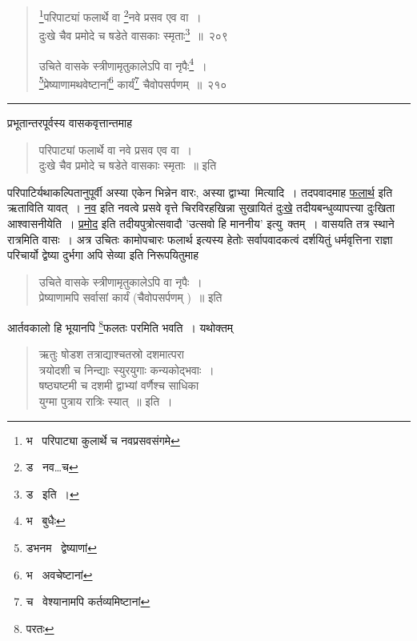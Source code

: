 \documentclass[11pt, openany]{book}
\begin{document}
\newpage

\begin{quote}
{\na \renewcommand{\thefootnote}{1}\footnote{भ \textendash\  परिपाट्या कुलार्थे च नवप्रसवसंगमे}परिपाट्यां फलार्थे वा \renewcommand{\thefootnote}{2}\footnote{ड \textendash\  नव\ldots च}नवे प्रसव एव वा~।\\
दुःखे चैव प्रमोदे च षडेते वासकाः स्मृताः\renewcommand{\thefootnote}{3}\footnote{ड \textendash\  इति~।}~॥~२०९

उचिते वासके स्त्रीणामृतुकालेऽपि वा नृपैः\renewcommand{\thefootnote}{4}\footnote{भ \textendash\  बुधैः}~।\\
\renewcommand{\thefootnote}{5}\footnote{डभनम \textendash\  द्वेष्याणां}प्रेष्याणामथवेष्टानां\renewcommand{\thefootnote}{6}\footnote{भ \textendash\  अवचेष्टानां} कार्यं\renewcommand{\thefootnote}{7}\footnote{च \textendash\  वेश्यानामपि कर्तव्यमिष्टानां} चैवोपसर्पणम्~॥~२१०}
\end{quote}

\hrule

\vspace{2mm}
प्रभूतान्तरपूर्वस्य वासकवृत्तान्तमाह\textendash

\begin{quote}
{\qt परिपाट्यां फलार्थे वा नवे प्रसव एव वा~।\\
दुःखे चैव प्रमोदे च षडेते वासकाः स्मृताः~॥} इति
\end{quote}

\noindent
परिपाटिर्यथाकल्पितानुपूर्वी अस्या एकेन भिन्नेन वारः, अस्या द्वाभ्या\textendash\ मित्यादि~। तदपवादमाह \underline{फलार्थ} इति ऋताविति यावत्~। \underline{नव} इति नवत्वे प्रसवे वृत्ते चिरविरहखिन्ना सुखायितं \underline{दुःखे} तदीयबन्धुव्यापत्त्या दुःखिता आश्वासनीयेति~। \underline{प्रमोद} इति तदीयपुत्रोत्सवादौ 'उत्सवो हि माननीय' इत्यु\textendash\ क्तम्~। वासयति तत्र स्थाने रात्रमिति वासः~। अत्र उचितः कामोपचारः फलार्थ इत्यस्य हेतोः सर्वापवादकत्वं दर्शयितुं धर्मवृत्तिना राज्ञा परिचार्यो द्वेष्या दुर्भगा अपि सेव्या इति निरूपयितुमाह\textendash

\begin{quote}
{\qt उचिते वासके स्त्रीणामृतुकालेऽपि वा नृपैः~।\\
प्रेष्याणामपि सर्वासां कार्यं (चैवोपसर्पणम् )~॥} इति
\end{quote}

\noindent
आर्तवकालो हि भूयानपि \renewcommand{\thefootnote}{*}\footnote{परतः}फलतः परमिति भवति~। यथोक्तम्\textendash

\begin{quote}
{\qt ऋतुः षोडश तत्राद्याश्चतस्रो दशमात्परा\\
त्रयोदशी च निन्द्याः स्युरयुगाः कन्यकोद्भवाः~।\\
षष्ठ्यष्टमी च दशमी द्वाभ्यां वर्णैश्च साधिका\\
युग्मा पुत्राय रात्रिः स्यात्~॥} इति~।
\end{quote}
\end{document}
